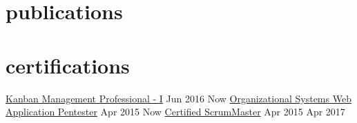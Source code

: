 \documentclass[]{cv} %
\begin{document}
\section{publications}


\section{certifications}
\entrysmall
{\href{https://www.iss.nus.edu.sg/ProfessionalCourses/SearchCourse/CourseDetail/tabid/267/cid/399/cname/lean-kanban-foundation/Default.aspx}{Kanban Management Professional - I}}
{Jun 2016 \to Now}
\entrysmall
{\href{http://securitystartshere.org/page-training-oswap.htm}{Organizational Systems Web Application Pentester}}
{Apr 2015 \to Now}
\entrysmall
{\href{https://www.scrumalliance.org/certifications/practitioners/certified-scrummaster-csm}{Certified ScrumMaster}}
{Apr 2015 \to Apr 2017}
\end{document}

